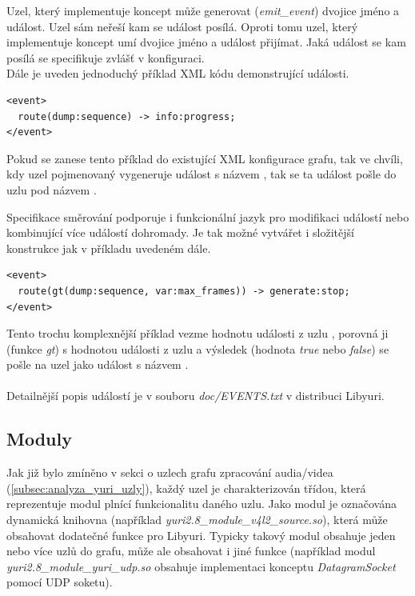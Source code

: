 \documentclass[thesis=M,czech]{FITthesis}[2012/06/26]
\begin{document}
Uzel, který implementuje koncept  může generovat (\textit{emit\_event}) dvojice jméno a událost. Uzel sám neřeší kam se událost posílá. Oproti tomu uzel, který implementuje koncept  umí dvojice jméno a událost přijímat. Jaká událost se kam posílá se specifikuje zvlášť v konfiguraci.\\

Dále je uveden jednoduchý příklad XML kódu demonstrující události.
\\
\lstset{language=XML}
\begin{lstlisting}
<event>
  route(dump:sequence) -> info:progress;
</event>
\end{lstlisting}

Pokud se zanese tento příklad do existující XML konfigurace grafu, tak ve chvíli, kdy uzel pojmenovaný  vygeneruje událost s názvem , tak se ta událost pošle do uzlu  pod názvem .

Specifikace směrování podporuje i funkcionální jazyk pro modifikaci událostí nebo kombinující více událostí dohromady. Je tak možné vytvářet i složitější konstrukce jak v příkladu uvedeném dále.
\\
\lstset{language=XML}
\begin{lstlisting}
<event>
  route(gt(dump:sequence, var:max_frames)) -> generate:stop;
</event>
\end{lstlisting}

Tento trochu komplexnější příklad vezme hodnotu události  z uzlu , porovná ji (funkce \textit{gt}) s hodnotou události  z uzlu  a výsledek (hodnota \textit{true} nebo \textit{false}) se pošle na uzel  jako událost s názvem .
\\ \\
Detailnější popis událostí je v souboru \textit{doc/EVENTS.txt} v distribuci Libyuri.
	
\subsection{Moduly} \label{subsec:analyza_yuri_moduly}
Jak již bylo zmíněno v sekci o uzlech grafu zpracování audia/videa (\ref{subsec:analyza_yuri_uzly}), každý uzel je charakterizován třídou, která reprezentuje modul plnící funkcionalitu daného uzlu. Jako modul je označována dynamická knihovna (například \textit{yuri2.8\_module\_v4l2\_source.so}), která může obsahovat dodatečné funkce pro Libyuri. Typicky takový modul obsahuje jeden nebo více uzlů do grafu, může ale obsahovat i jiné funkce (například modul \textit{yuri2.8\_module\_yuri\_udp.so} obsahuje implementaci konceptu \textit{DatagramSocket} pomocí UDP soketu). 
\end{document}
